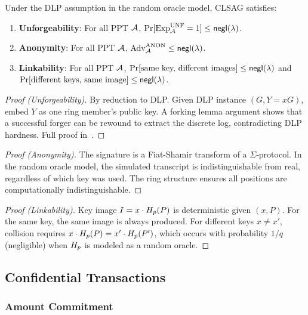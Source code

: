 \begin{theorem}
Under the DLP assumption in the random oracle model, CLSAG satisfies:
\begin{enumerate}
  \item \textbf{Unforgeability}: For all PPT $\mathcal{A}$,
    $\Pr[\text{Exp}^{\text{UNF}}_{\mathcal{A}} = 1] \leq \mathsf{negl}(\lambda)$.
  \item \textbf{Anonymity}: For all PPT $\mathcal{A}$,
    $\text{Adv}^{\text{ANON}}_{\mathcal{A}} \leq \mathsf{negl}(\lambda)$.
  \item \textbf{Linkability}: For all PPT $\mathcal{A}$,
    $\Pr[\text{same key, different images}] \leq \mathsf{negl}(\lambda)$ and
    $\Pr[\text{different keys, same image}] \leq \mathsf{negl}(\lambda)$.
\end{enumerate}
\end{theorem}

\begin{proof}[Proof (Unforgeability)]
By reduction to DLP. Given DLP instance $(G, Y = xG)$, embed $Y$ as one
ring member's public key. A forking lemma argument shows that a successful
forger can be rewound to extract the discrete log, contradicting DLP
hardness. Full proof in~\cite{clsag}.
\end{proof}

\begin{proof}[Proof (Anonymity)]
The signature is a Fiat-Shamir transform of a $\Sigma$-protocol. In the
random oracle model, the simulated transcript is indistinguishable from
real, regardless of which key was used. The ring structure ensures all
positions are computationally indistinguishable.
\end{proof}

\begin{proof}[Proof (Linkability)]
Key image $I = x \cdot H_p(P)$ is deterministic given $(x, P)$. For the
same key, the same image is always produced. For different keys $x \neq x'$,
collision requires $x \cdot H_p(P) = x' \cdot H_p(P')$, which occurs with
probability $1/q$ (negligible) when $H_p$ is modeled as a random oracle.
\end{proof}



\subsection{Confidential Transactions}



\subsubsection{Amount Commitment}

